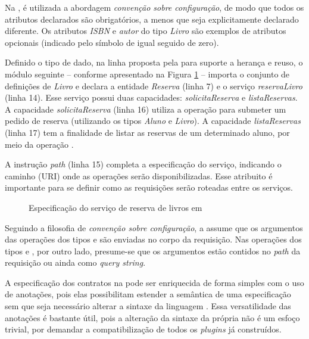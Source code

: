 Na \neoidl{}, é utilizada a abordagem \emph{convenção sobre configuração}, de
modo que todos os atributos declarados são obrigatórios, a menos que
seja explicitamente declarado diferente. Os atributos \emph{ISBN} e
\emph{autor} do tipo \emph{Livro} são exemplos de atributos opcionais (indicado
pelo símbolo de igual seguido de zero).

Definido o tipo de dado, na linha proposta pela \neoidl{} para
suporte a herança e reuso, o módulo seguinte -- conforme apresentado na Figura
\ref{lst:reservalivro-neo} -- importa o conjunto de definições de
\emph{Livro} e declara a entidade \emph{Reserva} (linha 7) e o serviço
\emph{reservaLivro} (linha 14).
Esse serviço possui duas capacidades:
\emph{solicitaReserva} e \emph{listaReservas}.
A capacidade \emph{solicitaReserva} (linha 16) utiliza a operação 
para submeter um pedido de reserva (utilizando os tipos \emph{Aluno} e
\emph{Livro}).
A capacidade \emph{listaReservas} (linha 17) tem a finalidade de listar as reservas de um
determinado aluno, por meio da operação
.

A instrução \emph{path} (linha 15) completa a especificação do serviço,
indicando o caminho (URI) onde as operações serão disponibilizadas. Esse atribuito é importante para se definir
como as requisições serão roteadas entre os serviços.

\vspace{6mm}

\begin{figure}[htb]
\begin{small}
%

\end{small}
\caption{Especificação do serviço de reserva de livros em \neoidl}
\label{lst:reservalivro-neo}
\end{figure}

Seguindo a filosofia de \emph{convenção sobre configuração}, a \neoidl{} assume
que os argumentos das operações dos tipos  e  são
enviadas no corpo da requisição. Nas operações dos tipos  e
, por outro lado, presume-se que os argumentos estão contidos no
\emph{path} da requisição ou ainda como \textit{query string}.

A especificação dos contratos na \neoidl{} pode ser enriquecida de forma simples
com o uso de anotações, pois elas possibilitam estender a semântica
de uma especificação sem que seja necessário alterar a sintaxe da
linguagem \neoidl{}. Essa versatilidade das anotações é bastante útil, pois a
alteração da sintaxe da própria \neoidl{} não é um esfoço trivial, por demandar
a compatibilização de todos os \textit{plugins} já construídos.

